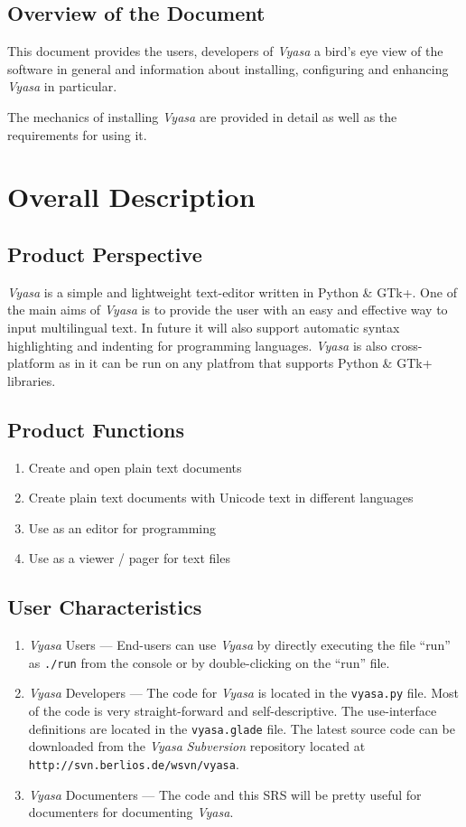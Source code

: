 \documentclass[12pt,a4paper]{article}
\newcommand{\VS}{\textit{Vyasa}}
\begin{document}
\subsection{Overview of the Document}
This document provides the users, developers of \VS{} a bird's eye view
of the software in general and information about installing, configuring
and enhancing \VS{} in particular.

The mechanics of installing \VS{} are provided in detail as well as the
requirements for using it.


\section{Overall Description}
\subsection{Product Perspective}
\VS{} is a simple and lightweight text-editor written in Python \&{}
GTk+. One of the main aims of \VS{} is to provide the user with an easy
and effective way to input multilingual text. In future it will also
support automatic syntax highlighting and indenting for programming
languages. \VS{} is also cross-platform as in it can be run on any
platfrom that supports Python \&{} GTk+ libraries.

\subsection{Product Functions}
\begin{enumerate}
\item Create and open plain text documents
\item Create plain text documents with Unicode text in different
  languages
\item Use as an editor for programming
\item Use as a viewer / pager for text files
\end{enumerate}

\subsection{User Characteristics}
\begin{enumerate}
\item \VS{} Users --- End-users can use \VS{} by directly executing the
  file ``run'' as \texttt{./run} from the console or by double-clicking on
  the ``run'' file.
\item \VS{} Developers --- The code for \VS{} is located in the
  \texttt{vyasa.py} file. Most of the code is very straight-forward and
  self-descriptive. The use-interface definitions are located in the
  \texttt{vyasa.glade} file. The latest source code can be downloaded
  from the \VS{} \textit{Subversion} repository located at
  \texttt{http://svn.berlios.de/wsvn/vyasa}.
\item \VS{} Documenters --- The code and this SRS will be pretty useful
  for documenters for documenting \VS.
\end{enumerate}
\end{document}
